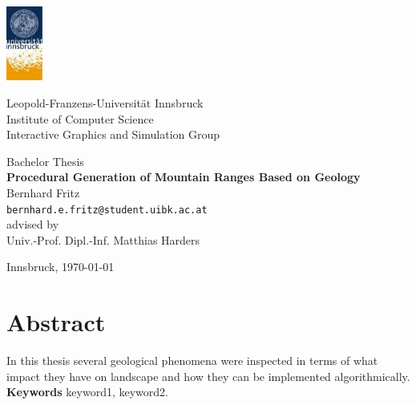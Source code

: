\documentclass[11pt,a4paper,twoside,openright]{report}
\begin{document}

\begin{titlepage} %

\begin{center}
\includegraphics[width=1.2cm]{images/uibk}

\begin{large}
Leopold-Franzens-Universität Innsbruck\\[5mm]
Institute of Computer Science\\
Interactive Graphics and Simulation Group\\[25mm]
\end{large}

Bachelor Thesis\\[15mm]

{\LARGE \bf Procedural Generation of Mountain Ranges Based on Geology}\\[15mm]

Bernhard Fritz\\
\texttt{bernhard.e.fritz@student.uibk.ac.at}\\[35mm]

advised by\\
Univ.-Prof. Dipl.-Inf. Matthias Harders\\[10mm]

\vfill

Innsbruck, \today
\end{center}

\end{titlepage}





\chapter*{Abstract}
In this thesis several geological phenomena were inspected in terms of what impact they have on landscape and how they can be implemented algorithmically.
\medskip
\noindent \\\textbf{Keywords} keyword1, keyword2.
\end{document}
